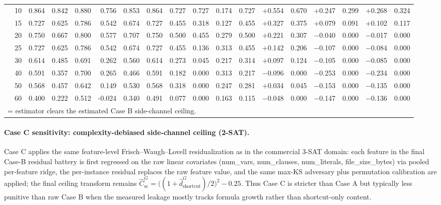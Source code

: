 \documentclass[conference]{IEEEtran}
\theoremstyle{remark}
\newcommand{\hatshortcutDisc}{\hat d_{\mathrm{shortcut}}^{G}}
\newcommand{\hatshortcutCeiling}{\widehat{C}_{\mathrm{sc}}^{G}}
\begin{document}
\begin{table}[ht]
{\begin{tabular}{p{2.2cm}r rrrr rr rr rr rr rr rr}
  & 10 & 0.864 & 0.842 & 0.880 & 0.756 & 0.853 & 0.864 & 0.727 & 0.727 & 0.174 & 0.727 & \cellcolor{green!15}$+$0.554 & \cellcolor{green!15}0.670 & \cellcolor{green!15}$+$0.247 & \cellcolor{green!15}0.299 & \cellcolor{green!15}$+$0.268 & \cellcolor{green!15}0.324 \\
  & 15 & 0.727 & 0.625 & 0.786 & 0.542 & 0.674 & 0.727 & 0.455 & 0.318 & 0.127 & 0.455 & \cellcolor{green!15}$+$0.327 & \cellcolor{green!15}0.375 & \cellcolor{green!15}$+$0.079 & \cellcolor{green!15}0.091 & \cellcolor{green!15}$+$0.102 & \cellcolor{green!15}0.117 \\
  & 20 & 0.750 & 0.667 & 0.800 & 0.577 & 0.707 & 0.750 & 0.500 & 0.455 & 0.279 & 0.500 & \cellcolor{green!15}$+$0.221 & \cellcolor{green!15}0.307 & $-$0.040 & 0.000 & $-$0.017 & 0.000 \\
  & 25 & 0.727 & 0.625 & 0.786 & 0.542 & 0.674 & 0.727 & 0.455 & 0.136 & 0.313 & 0.455 & \cellcolor{green!15}$+$0.142 & \cellcolor{green!15}0.206 & $-$0.107 & 0.000 & $-$0.084 & 0.000 \\
  & 30 & 0.614 & 0.485 & 0.691 & 0.262 & 0.560 & 0.614 & 0.273 & 0.045 & 0.217 & 0.314 & \cellcolor{green!15}$+$0.097 & \cellcolor{green!15}0.124 & $-$0.105 & 0.000 & $-$0.085 & 0.000 \\
  & 40 & 0.591 & 0.357 & 0.700 & 0.265 & 0.466 & 0.591 & 0.182 & 0.000 & 0.313 & 0.217 & $-$0.096 & 0.000 & $-$0.253 & 0.000 & $-$0.234 & 0.000 \\
  & 50 & 0.568 & 0.457 & 0.642 & 0.149 & 0.530 & 0.568 & 0.318 & 0.000 & 0.247 & 0.281 & \cellcolor{green!15}$+$0.034 & \cellcolor{green!15}0.045 & $-$0.153 & 0.000 & $-$0.135 & 0.000 \\
  & 60 & 0.400 & 0.222 & 0.512 & -0.024 & 0.340 & 0.491 & 0.077 & 0.000 & 0.163 & 0.115 & $-$0.048 & 0.000 & $-$0.147 & 0.000 & $-$0.136 & 0.000 \\
\bottomrule
\multicolumn{18}{l}{\colorbox{green!15}{\phantom{X}} = estimator clears the estimated Case B side-channel ceiling.}
\end{tabular}%
}
\end{table}

\paragraph{Case C sensitivity: complexity-debiased side-channel ceiling (2-SAT).}
Case C applies the same feature-level Frisch--Waugh--Lovell residualization as in the commercial 3-SAT domain: each feature in the final Case-B residual battery is first regressed on the raw linear covariates (num\_vars, num\_clauses, num\_literals, file\_size\_bytes) via pooled per-feature ridge, the per-instance residual replaces the raw feature value, and the same max-KS adversary plus permutation calibration are applied; the final ceiling transform remains
$\hatshortcutCeiling=\bigl((1+\hatshortcutDisc)/2\bigr)^2-0.25$.
Thus Case C is stricter than Case A but typically less punitive than raw Case B when the measured leakage mostly tracks formula growth rather than shortcut-only content.
\end{document}
